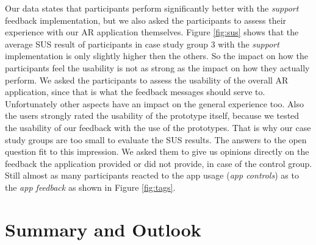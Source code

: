 \documentclass[11pt, a4paper]{article}
\begin{document}
			Our data states that participants perform significantly better with the \emph{support} feedback implementation, but we also asked the participants to assess their experience with our \ac{AR} application themselves. Figure \ref{fig:sus} shows that the average \ac{SUS} result of participants in case study group 3 with the \emph{support} implementation is only slightly higher then the others. So the impact on how the participants feel the usability is not as strong as the impact on how they actually perform. We asked the participants to assess the usability of the overall AR application, since that is what the feedback messages should serve to. Unfortunately other aspects have an impact on the general experience too. Also the users strongly rated the usability of the prototype itself, because we tested the usability of our feedback with the use of the prototypes. That is why our case study groups are too small to evaluate the \ac{SUS} results. The answers to the open question fit to this impression. We asked them to give us opinions directly on the feedback the application provided or did not provide, in case of the control group. Still almost as many participants reacted to the app usage (\emph{app controls}) as to the \emph{app feedback} as shown in Figure \ref{fig:tags}.
			




	\section*{Summary and Outlook}\label{sec:summary}
		\lipsum[2-3]

	\pagebreak
	\printbibliography
\restoregeometry
\end{document}
